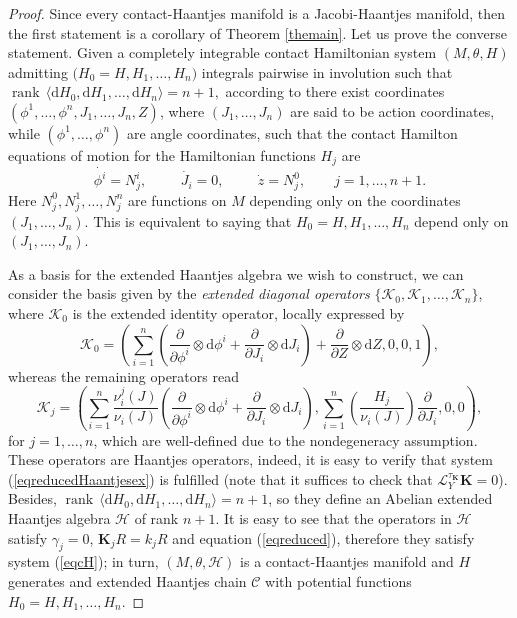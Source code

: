 \documentclass[10pt]{amsart}
\numberwithin{equation}{section}
\newcommand{\rd}{\mathrm{d}}
\newcommand{\bs}{\boldsymbol}
\DeclareMathOperator{\rank}{rank}
\theoremstyle{definition}
\begin{document}
\begin{proof}
Since every contact-Haantjes manifold is a Jacobi-Haantjes manifold, then the first statement is a corollary of Theorem \ref{themain}. Let us prove the converse statement. Given a completely integrable contact Hamiltonian system $(M,\theta,H)$ admitting $\big(H_{0}=H,H_{1},\ldots,H_{n}\big)$ integrals pairwise in involution such that $\rank \,\langle \rd H_{0},\rd H_{1},\ldots,\rd H_{n}\rangle=n+1,$ according to \cite{CLLL2023pr} there exist coordinates $(\phi^{1},\ldots,\phi^{n},J_{1},\ldots,J_{n},Z)$, where $(J_{1},\ldots,J_{n})$ are said to be action coordinates, while $(\phi^{1},\ldots,\phi^{n})$ are angle coordinates, such that the contact Hamilton equations of motion for the Hamiltonian functions $H_{j}$ are
\begin{equation}
\dot{\phi^{i}}=N^{i}_{j}, \hspace{1cm}
\dot{J_{i}}=0 , \hspace{1cm}
\dot{z}=N^{0}_{j}, \qquad  j=1, \ldots, n+1.
\end{equation}
Here $N^{0}_{j},N^{1}_{j},\ldots,N^{n}_{j}$ are functions on $M$ depending only on the coordinates $(J_{1},\ldots,J_{n})$. This is equivalent to saying that $H_{0}=H,H_{1},\ldots,H_{n}$ depend only on $(J_{1},\ldots,J_{n})$.

As a basis for the extended Haantjes algebra we wish to construct, we can consider the basis given by the \textit{extended diagonal operators}
$\lbrace\bs{\mathcal{K}}_{0},\bs{\mathcal{K}}_{1},\ldots,\bs{\mathcal{K}}_{n}\rbrace$, where $\bs{\mathcal{K}}_{0}$ is the extended identity operator, locally expressed by
\begin{equation}
\bs{\mathcal{K}}_{0}=\left(\sum_{i=1}^{n}\left(\frac{\partial}{\partial \phi^{i}}\otimes \rd \phi^{i}+\frac{\partial}{\partial J_{i}}\otimes \rd J_{i}\right)+\frac{\partial}{\partial Z}\otimes \rd Z,0,0,1\right),
\end{equation}
whereas the remaining operators read
\begin{equation}
\bs{\mathcal{K}}_{j}=\left(\sum_{i=1}^{n}\frac{ \nu_i^{j}(J)}{\nu_i (J)}\left(\frac{\partial}{\partial \phi^{i}}\otimes \rd \phi^{i}+\frac{\partial}{\partial J_{i}}\otimes \rd J_{i}\right),\sum_{i=1}^{n}\left(\frac{H_{j}}{\nu_i(J)}\right)\frac{\partial}{\partial J_{i}},0,0\right),
\end{equation}
for $j=1,\ldots,n$, which are well-defined due to the nondegeneracy assumption. These operators are Haantjes operators, indeed, it is easy to verify that system (\ref{eqreducedHaantjesex}) is fulfilled (note that it suffices to check that $\mathcal{L}_{Y}^{\tau_{\bs{K}}}\bs{K}=0$). Besides, $\rank \,\langle \rd H_{0},\rd H_{1},\ldots,\rd H_{n}\rangle=n+1$, so they define an Abelian extended Haantjes algebra $\mathscr{H}$ of rank $n+1$. It is easy to see that the operators in $\mathscr{H}$ satisfy $\gamma_{j}=0$, $\bs{K}_{j}R=k_{j}R$ and equation (\ref{eqreduced}), therefore they satisfy system (\ref{eqcH}); in turn, $(M,\theta,\mathscr{H})$ is a contact-Haantjes manifold and $H$ generates and extended Haantjes chain $\mathscr{C}$ with potential functions $H_{0}=H,H_{1},\ldots,H_{n}$. 
\end{proof}
\end{document}
